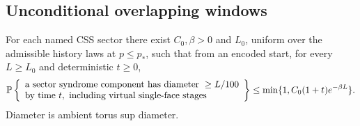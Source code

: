\subsection{Unconditional overlapping windows}

\begin{proposition}
\label{prop:ls-history}
For each named CSS sector there exist \(C_0,\beta>0\) and
\(L_0\), uniform over the admissible history laws at
\(p\le p_*\), such that from an encoded start, for every
\(L\ge L_0\) and deterministic \(t\ge0\),
\begin{equation}\label{eq:ls-history}
 \mathbb P\left\{\begin{array}{l}
 \text{a sector syndrome component has diameter }\ge L/100\\
 \text{by time }t,\text{ including virtual single-face stages}
 \end{array}\right\}
 \le\min\{1,C_0(1+t)e^{-\beta L}\}.
\end{equation}
Diameter is ambient torus sup diameter.
\end{proposition}
